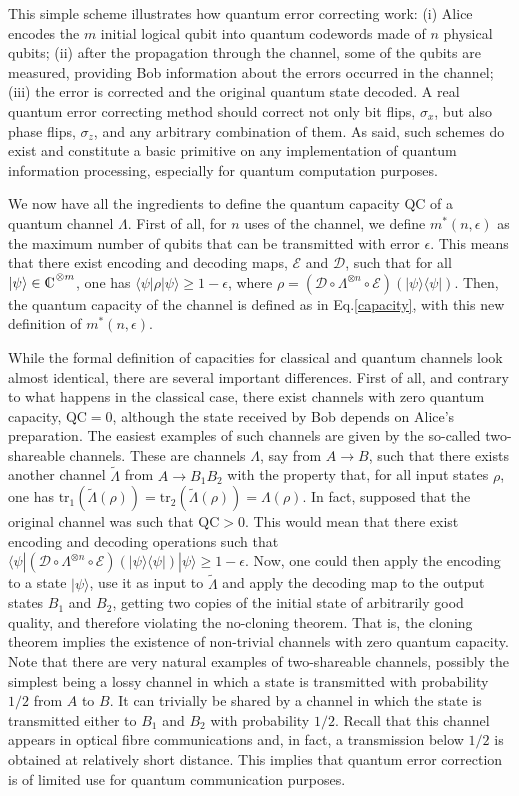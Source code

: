 \documentclass[a4paper]{article}
\def\tr{\mbox{tr}}
\def\compl{\begin{picture}(8,8)\put(0,0){C}\put(3,0.3){\line(0,1){7}}\end{picture}}
\def\bra#1{\langle#1|} \def\ket#1{|#1\rangle}
\def\proj#1{\ket{#1}\!\bra{#1}}
\begin{document}
This simple scheme illustrates how quantum error correcting work: (i) Alice encodes the
$m$ initial logical qubit into quantum codewords made of $n$ physical
qubits; (ii) after the propagation through the channel, some of the
qubits are measured, providing Bob information about the errors
occurred in the channel; (iii) the error is corrected and the
original quantum state decoded. A real quantum error correcting
method should correct not only bit flips, $\sigma_x$, but also
phase flips, $\sigma_z$, and any arbitrary combination of them. As
said, such schemes do exist and constitute a basic primitive on
any implementation of quantum information processing, especially for quantum computation purposes.

We now have all the ingredients to define the quantum capacity $\text{QC}$ of a quantum channel $\Lambda$. First of all, for $n$ uses of the channel, we define $m^*(n,\epsilon)$ as the maximum number of qubits that can be transmitted with error $\epsilon$. This means that there exist encoding and decoding maps, $\mathcal E$ and $\mathcal D$, such that for all $\ket\psi\in\compl^{\otimes m}$, one has $\bra\psi\rho\ket\psi\geq 1-\epsilon$, where $\rho=(\mathcal D\circ\Lambda^{\otimes n}\circ\mathcal E)(\proj\psi)$. Then, the quantum capacity of the channel is defined as in Eq.\eqref{capacity}, with this new definition of $m^*(n,\epsilon)$.

While the formal definition of capacities for classical and quantum channels look almost identical, there are several important differences. First of all, and contrary to what happens in the classical case, there exist channels with zero quantum capacity, $\text{QC}=0$, although the state received by Bob depends on Alice's preparation. The easiest examples of such channels are given by the so-called two-shareable channels. These are channels $\Lambda$, say from $A\rightarrow B$, such that there exists another channel $\tilde\Lambda$ from $A\rightarrow B_1B_2$ with the property that, for all input states $\rho$, one has $\tr_1(\tilde\Lambda(\rho))=\tr_2(\tilde\Lambda(\rho))=\Lambda(\rho)$. In fact, supposed that the original channel was such that $\text{QC}>0$. This would mean that there exist encoding and decoding operations such that  $\bra\psi(\mathcal D\circ\Lambda^{\otimes n}\circ\mathcal E)(\proj\psi)\ket\psi\geq 1-\epsilon$. Now, one could then apply the encoding to a state $\ket\psi$, use it as input to $\tilde\Lambda$ and apply the decoding map to the output states $B_1$ and $B_2$, getting two copies of the initial state of arbitrarily good quality, and therefore violating the no-cloning theorem. That is, the cloning theorem implies the existence of non-trivial channels with zero quantum capacity. Note that there are very natural examples of two-shareable channels, possibly the simplest being a lossy channel in which a state is transmitted with probability $1/2$ from $A$ to $B$. It can trivially be shared by a channel in which the state is transmitted either to $B_1$ and $B_2$ with probability $1/2$. Recall that this channel appears in optical fibre communications and, in fact, a transmission below $1/2$ is obtained at relatively short distance. This implies that quantum error correction is of limited use for quantum communication purposes. 
\end{document}

